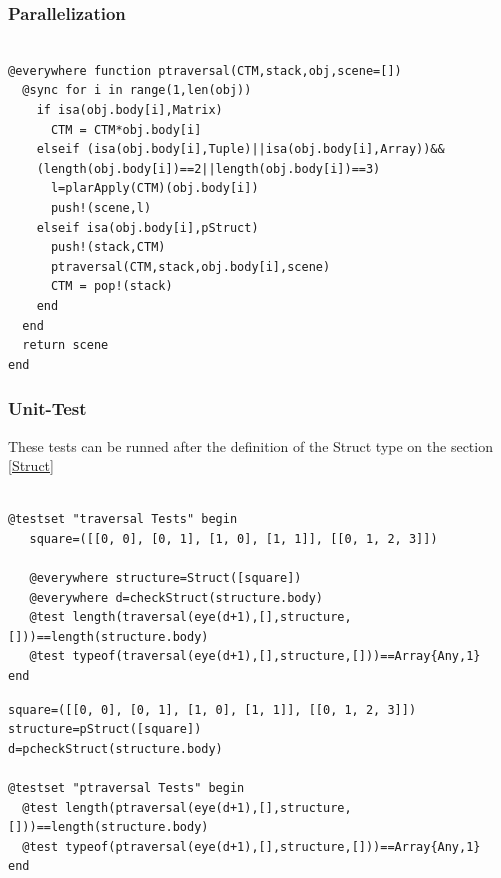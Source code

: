 \documentclass[a4paper,12pt]{article}
\begin{document}
\subsubsection{Parallelization}
\begin{Verbatim}[fontsize=\footnotesize]

@everywhere function ptraversal(CTM,stack,obj,scene=[])
  @sync for i in range(1,len(obj))
    if isa(obj.body[i],Matrix)
      CTM = CTM*obj.body[i]
    elseif (isa(obj.body[i],Tuple)||isa(obj.body[i],Array))&&
    (length(obj.body[i])==2||length(obj.body[i])==3)
      l=plarApply(CTM)(obj.body[i])
      push!(scene,l)
    elseif isa(obj.body[i],pStruct)
      push!(stack,CTM)
      ptraversal(CTM,stack,obj.body[i],scene)
      CTM = pop!(stack)
    end
  end
  return scene
end

\end{Verbatim}
\subsubsection{Unit-Test}
These tests can be runned after the definition of the Struct type on the section \ref{Struct}
\vspace{25px}

\noindent {}
\begin{Verbatim}[fontsize=\footnotesize]

@testset "traversal Tests" begin
   square=([[0, 0], [0, 1], [1, 0], [1, 1]], [[0, 1, 2, 3]])
   
   @everywhere structure=Struct([square])
   @everywhere d=checkStruct(structure.body)
   @test length(traversal(eye(d+1),[],structure,[]))==length(structure.body)
   @test typeof(traversal(eye(d+1),[],structure,[]))==Array{Any,1}
end
\end{Verbatim}

\noindent {}
\begin{Verbatim}[fontsize=\footnotesize]
square=([[0, 0], [0, 1], [1, 0], [1, 1]], [[0, 1, 2, 3]])
structure=pStruct([square])
d=pcheckStruct(structure.body)

@testset "ptraversal Tests" begin
  @test length(ptraversal(eye(d+1),[],structure,[]))==length(structure.body)
  @test typeof(ptraversal(eye(d+1),[],structure,[]))==Array{Any,1}
end
\end{Verbatim}
\end{document}
